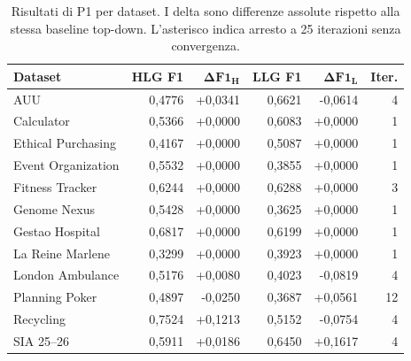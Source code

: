 \begin{table}[htbp]
\centering
\small
\caption{Risultati di P1 per dataset. I delta sono differenze assolute rispetto alla stessa baseline top-down. L'asterisco indica arresto a 25 iterazioni senza convergenza.}
\label{tab:results-P1-datasets}
\begin{tabular}{lrrrrr}
\toprule
\textbf{Dataset} & \textbf{HLG F1} & $\boldsymbol{\Delta F1_H}$ & \textbf{LLG F1} & $\boldsymbol{\Delta F1_L}$ & \textbf{Iter.} \\
\midrule
AUU & 0,4776 & +0,0341 & 0,6621 & -0,0614 & 4 \\
Calculator & 0,5366 & +0,0000 & 0,6083 & +0,0000 & 1 \\
Ethical Purchasing & 0,4167 & +0,0000 & 0,5087 & +0,0000 & 1 \\
Event Organization & 0,5532 & +0,0000 & 0,3855 & +0,0000 & 1 \\
Fitness Tracker & 0,6244 & +0,0000 & 0,6288 & +0,0000 & 3 \\
Genome Nexus & 0,5428 & +0,0000 & 0,3625 & +0,0000 & 1 \\
Gestao Hospital & 0,6817 & +0,0000 & 0,6199 & +0,0000 & 1 \\
La Reine Marlene & 0,3299 & +0,0000 & 0,3923 & +0,0000 & 1 \\
London Ambulance & 0,5176 & +0,0080 & 0,4023 & -0,0819 & 4 \\
Planning Poker & 0,4897 & -0,0250 & 0,3687 & +0,0561 & 12 \\
Recycling & 0,7524 & +0,1213 & 0,5152 & -0,0754 & 4 \\
SIA 25--26 & 0,5911 & +0,0186 & 0,6450 & +0,1617 & 4 \\
\bottomrule
\end{tabular}
\end{table}

